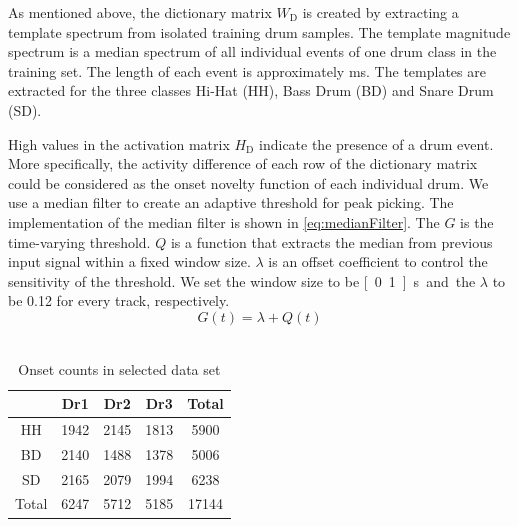 \documentclass[a4paper]{article}
\begin{document}
As mentioned above, the dictionary matrix $W_\mathrm{D}$ is created by extracting a template spectrum from isolated training drum samples. The template magnitude spectrum is a median spectrum of all individual events of one drum class in the training set. The length of each event  is approximately \unit[80]{ms}. The templates are extracted for the three classes Hi-Hat (HH), Bass Drum (BD) and Snare Drum (SD).   

High values in the activation matrix $H_\mathrm{D}$ indicate the presence of a drum event. More specifically, the activity difference of each row of the dictionary matrix could be considered as the onset novelty function of each individual drum. We use a median filter to create an adaptive threshold for peak picking.  
The implementation of the median filter is shown in \eqref{eq:medianFilter}. The $G$ is the time-varying threshold. $Q$ is a function that extracts the median from previous input signal within a fixed window size. $\lambda$ is an offset coefficient to control the sensitivity of the threshold. We set the window size to be \unit[0.1]{s} and the $\lambda$  to be 0.12 for every track, respectively.
\begin{equation}
G(t) = \lambda + Q(t)
\label{eq:medianFilter}
\end{equation}\\
\vspace{-2mm}

\begin{table}[ht]
\begin{footnotesize}
\centering
\begin{tabular}{|c|c|c|c|c|}
\hline
 & Dr1    & Dr2    & Dr3    & Total \\ \hline
HH        & 1942 & 2145 & 1813 & 5900  \\ \hline
BD        & 2140 & 1488 & 1378 & 5006  \\ \hline
SD        & 2165 & 2079 & 1994 & 6238  \\ \hline
Total     & 6247 & 5712 & 5185 & 17144 \\ \hline
\end{tabular}
 \caption{Onset counts in selected data set}%
 \label{tab:onsetCount}
\end{footnotesize}
\end{table}
\end{document}
